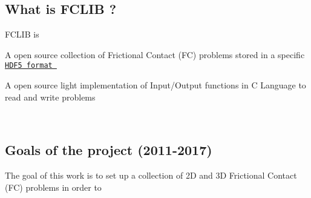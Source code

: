 \hypertarget{index_whatis}{}\subsection{What is F\+C\+L\+I\+B ?}\label{index_whatis}
F\+C\+L\+IB is 
\begin{DoxyItemize}
\item A open source collection of Frictional Contact (FC) problems stored in a specific \href{http://www.hdfgroup.org/HDF5/}{\tt H\+D\+F5 format } 
\item A open source light implementation of Input/\+Output functions in C Language to read and write problems  
\end{DoxyItemize}~\newline
\hypertarget{index_goals}{}\subsection{Goals of the project (2011-\/2017)}\label{index_goals}
The goal of this work is to set up a collection of 2D and 3D Frictional Contact (FC) problems in order to


